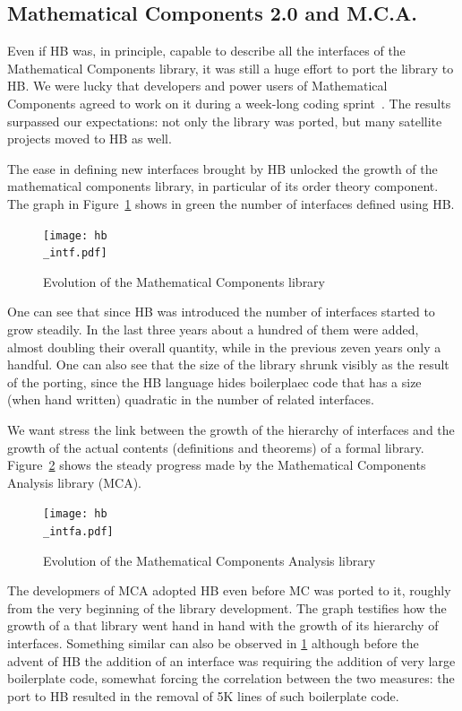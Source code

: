 \documentclass[a4paper, 11pt]{book}
\begin{document}
\subsection{Mathematical Components 2.0 and M.C.A.}

Even if HB was, in principle, capable to describe all the interfaces of
the Mathematical Components library, it was still a huge effort to port the
library to HB.  We were lucky that developers and power users of
Mathematical Components agreed to work on it during a week-long coding
sprint~\cite{affeldt:hal-03463762}. The results surpassed our expectations:
not only the library was ported, but many satellite projects moved to
HB as well.

The ease in defining new interfaces brought by HB unlocked 
the growth of the mathematical components library, in particular of
its order theory component. The graph in Figure~\ref{fig:mc} shows in green the
number of interfaces defined using HB.

\begin{figure}[!ht]
\texttt{[image: hb\\\_intf.pdf]}
\caption{Evolution of the Mathematical Components library\label{fig:mc}}
\end{figure}

One can see that since HB was introduced the number of
interfaces started to grow steadily. In the last three years about a hundred
of them were added, almost doubling their overall quantity,
while in the previous zeven years only a handful.
One can also see that the size of the library shrunk visibly as the result of
the porting, since the HB language hides boilerplaec code that has a size
(when hand written) quadratic in the number of related interfaces.

We want stress the link between the growth of the hierarchy of interfaces and
the growth of the actual contents (definitions and theorems) of a formal
library. Figure~\ref{fig:mca} shows the steady progress made by the
Mathematical Components Analysis library (MCA).

\begin{figure}[!hb]
\texttt{[image: hb\\\_intfa.pdf]}
\caption{Evolution of the Mathematical Components Analysis library\label{fig:mca}}
\end{figure}

The developmers of MCA adopted HB even before MC was ported to it, roughly from
the very beginning of the library development. The graph testifies how
the growth of a that library went hand in hand with the growth of
its hierarchy of interfaces. Something similar can also be observed in
\ref{fig:mc} although before the advent of HB the addition of an interface
was requiring the addition of very large boilerplate code, somewhat forcing
the correlation between the two measures: the port to HB resulted in the
removal of 5K lines of such boilerplate code.
\end{document}

